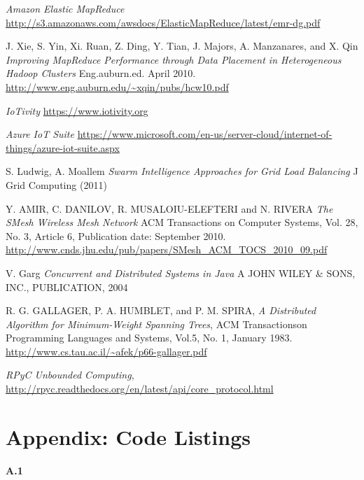 \documentclass[11pt]{article}
\begin{document}
\begin{thebibliography}{9}

  \emph{Amazon Elastic MapReduce}
  \url{http://s3.amazonaws.com/awsdocs/ElasticMapReduce/latest/emr-dg.pdf}
  
  J. Xie, S. Yin, Xi. Ruan, Z. Ding, Y. Tian, J. Majors, A. Manzanares, and X. Qin
  \emph{Improving MapReduce Performance through Data Placement in Heterogeneous Hadoop Clusters}
   Eng.auburn.ed. April 2010.
  \url{http://www.eng.auburn.edu/~xqin/pubs/hcw10.pdf}
  
  \emph{IoTivity}
  \url{https://www.iotivity.org}
  
  \emph{Azure IoT Suite}
  \url{https://www.microsoft.com/en-us/server-cloud/internet-of-things/azure-iot-suite.aspx}
  
  S. Ludwig, A. Moallem
  \emph{Swarm Intelligence Approaches for Grid Load Balancing}
  J Grid Computing (2011)
  
  Y. AMIR, C. DANILOV, R. MUSALOIU-ELEFTERI and N. RIVERA
  \emph{The SMesh Wireless Mesh Network}
  ACM Transactions on Computer Systems, Vol. 28, No. 3, Article 6, Publication date: September 2010.
  \url{http://www.cnds.jhu.edu/pub/papers/SMesh_ACM_TOCS_2010_09.pdf}

 V. Garg
 \emph{Concurrent and Distributed Systems in Java}
  A JOHN WILEY \& SONS, INC., PUBLICATION, 2004
 
  R. G. GALLAGER, P. A. HUMBLET, and P. M. SPIRA,
  \emph{A Distributed Algorithm for Minimum-Weight Spanning Trees},
  ACM Transactionson Programming Languages and Systems, Vol.5, No. 1, January 1983.
  \url{http://www.cs.tau.ac.il/~afek/p66-gallager.pdf}

  \emph{RPyC Unbounded Computing},
  \url{http://rpyc.readthedocs.org/en/latest/api/core_protocol.html}
  
\end{thebibliography}

\section{Appendix: Code Listings}
\appendix
\begin{center}
\large{\textbf{A.1}}
\end{center}
\begin{algorithmic}
\EndFunction
\end{algorithmic}
\end{document}
